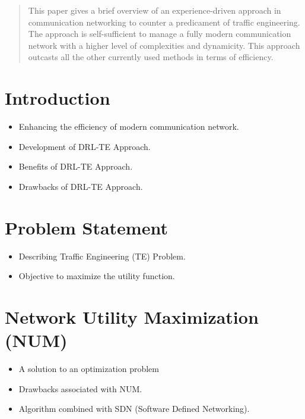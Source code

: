 %
% 


\begin{abstract}
  This paper gives a brief overview of an experience-driven approach in communication networking to counter a predicament of traffic engineering. The approach is self-sufficient to manage a fully modern communication network with a higher level of complexities and dynamicity. This approach outcasts all the other currently used methods in terms of efficiency.
\end{abstract}


\section{Introduction}
\label{sec:introduction}

\begin{itemize}

\item Enhancing the efficiency of modern communication network.
\item Development of DRL-TE Approach. 
\item Benefits of DRL-TE Approach.
\item Drawbacks of DRL-TE Approach.
 
\end{itemize}



\section{Problem Statement}
\label{sec:problem}
\begin{itemize}

\item Describing Traffic Engineering (TE) Problem. 
\item Objective to maximize the utility function.
 
\end{itemize}

\section{Network Utility Maximization (NUM)}
\begin{itemize}
\item A solution to an optimization problem \cite{low_Lapsley:_handb_Flowcontrol}

\item Drawbacks associated with NUM. 

\item Algorithm combined with SDN (Software Defined Networking). 

\label{sec:NUM}
\end{itemize}

